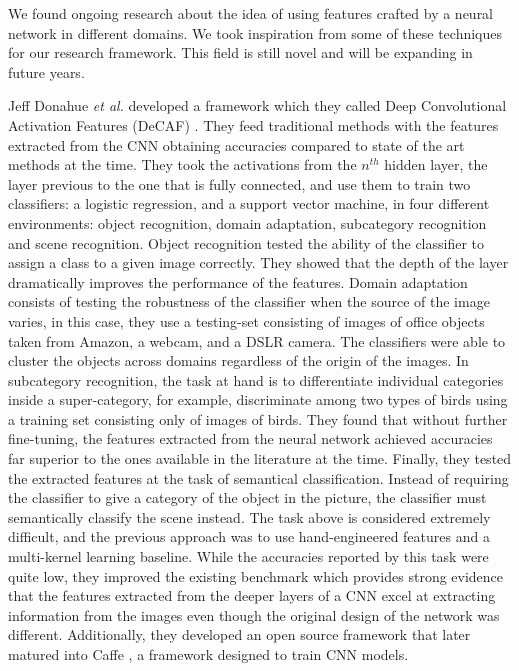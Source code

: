 We found ongoing research about the idea of using features crafted by a neural network in different domains. We took inspiration from some of these techniques for our research framework. This field is still novel and will be expanding in future years.

Jeff Donahue \textit{et al.} developed a framework which they called Deep Convolutional Activation Features (DeCAF) \cite{DBLP:journals/corr/DonahueJVHZTD13}. They feed traditional methods with the features extracted from the CNN obtaining accuracies compared to state of the art methods at the time. They took the activations from the $n^{th}$ hidden layer, the layer previous to the one that is fully connected, and use them to train two classifiers: a logistic regression, and a support vector machine, in four different environments: object recognition, domain adaptation, subcategory recognition and scene recognition. Object recognition tested the ability of the classifier to assign a class to a given image correctly. They showed that the depth of the layer dramatically improves the performance of the features. Domain adaptation consists of testing the robustness of the classifier when the source of the image varies, in this case, they use a testing-set consisting of images of office objects taken from Amazon, a webcam, and a DSLR camera. The classifiers were able to cluster the objects across domains regardless of the origin of the images. In subcategory recognition, the task at hand is to differentiate individual categories inside a super-category, for example, discriminate among two types of birds using a training set consisting only of images of birds. They found that without further fine-tuning, the features extracted from the neural network achieved accuracies far superior to the ones available in the literature at the time. Finally, they tested the extracted features at the task of semantical classification. Instead of requiring the classifier to give a category of the object in the picture, the classifier must semantically classify the scene instead. The task above is considered extremely difficult, and the previous approach was to use hand-engineered features and a multi-kernel learning baseline. While the accuracies reported by this task were quite low, they improved the existing benchmark which provides strong evidence that the features extracted from the deeper layers of a CNN excel at extracting information from the images even though the original design of the network was different. Additionally, they developed an open source framework that later matured into Caffe \cite{jia2014caffe}, a framework designed to train CNN models.\\


